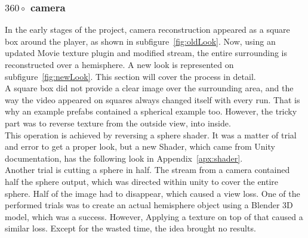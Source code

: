 \subsubsection{$360\circ$ camera}	
In the early stages of the project, camera reconstruction appeared as a square box around the player, as shown in subfigure~\ref{fig:oldLook}. 
Now, using an updated Movie texture plugin and modified stream, the entire surrounding is reconstructed over a hemisphere. 
A new look is represented on subfigure~\ref{fig:newLook}.
This section will cover the process in detail.\\
A square box did not provide a clear image over the surrounding area, and the way the video appeared on squares always changed itself with every run. 
That is why an example prefabs contained a spherical example too.
However, the tricky part was to reverse texture from the outside view, into inside.\\    
This operation is achieved by reversing a sphere shader.
It was a matter of trial and error to get a proper look, but a new Shader, which came from Unity documentation, has the following look in Appendix~\ref{apx:shader}. \\[1pc]
Another trial is cutting a sphere in half. 
The stream from a camera contained half the sphere output, which was directed within unity to cover the entire sphere.
Half of the image had to disappear, which caused a view loss.
One of the performed trials was to create an actual hemisphere object using a Blender 3D model, which was a success.
However, Applying a texture on top of that caused a similar loss.
Except for the wasted time, the idea brought no results.

